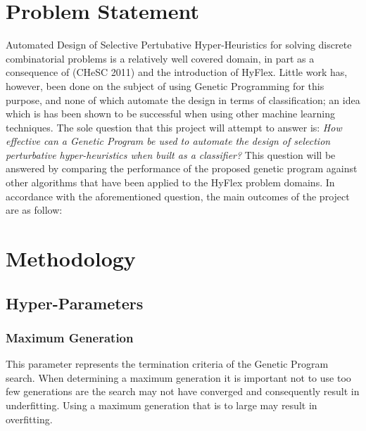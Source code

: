 \documentclass[a4paper,12pt]{article}
\begin{document}
\section{Problem Statement} \label{sec:ps}
    \par{
        \noindent
        Automated Design of Selective Pertubative Hyper-Heuristics for solving discrete
        combinatorial problems is a relatively well covered domain, in part as a consequence of (CHeSC 2011) 
        and the introduction of HyFlex. Little work has, however, been done on the subject of 
        using Genetic Programming for this purpose, and none of which automate the design in 
        terms of classification; an idea which is has been shown to be successful when using 
        other machine learning techniques.\newline 
        \newline 
        The sole question that this project will attempt to answer is: \newline 
        \newline 
        \textit{How effective can a Genetic Program be used to automate the design of selection perturbative 
        hyper-heuristics when built as a classifier?}\newline 
        \newline 
        This question will be answered by comparing the performance of the proposed genetic program against other
        algorithms that have been applied to the HyFlex problem domains.\newline 
        \newline 
        In accordance with the aforementioned question, the main outcomes of the
        project are as follow:
    }
\section{Methodology} \label{sec:methodology}
    \subsection{Hyper-Parameters}
        \subsubsection*{Maximum Generation} \label{subsubsec:mg}
            \par{
                \noindent
                This parameter represents the termination criteria of the Genetic Program search. When determining a maximum generation it is important 
                not to use too few generations are the search may not have converged and consequently result in underfitting. Using a maximum 
                generation that is to large may result in overfitting.  
            }
\end{document}
